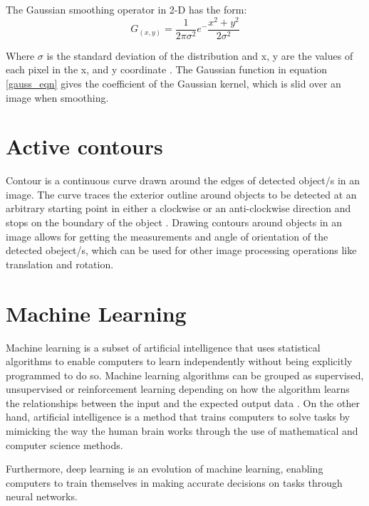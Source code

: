 The Gaussian smoothing operator in 2-D has the form:
\begin{equation} \label{gauss_eqn}
G_{(x,y)} = \frac{1}{2 \pi \sigma^2}e^-{\frac{x^2+y^2}{2\sigma^2}}
\end{equation}
 
Where $\sigma$ is the standard deviation of the distribution and x, y are the values of each pixel in the x, and y coordinate \cite{hsiao2007generic}. The Gaussian function in equation \ref{gauss_eqn} gives the coefficient of the Gaussian kernel, which is slid over an image when smoothing.

\section{Active contours}
Contour is a continuous curve drawn around the edges of detected object/s in an image. The curve traces the exterior outline around objects to be detected at an arbitrary starting point in either a clockwise or an anti-clockwise direction and stops on the boundary of the object \cite{waldchen2018plant}. Drawing contours around objects in an image allows for getting the measurements and angle of orientation of the detected obeject/s, which can be used for other image processing operations like translation and rotation. 



\section{Machine Learning}

Machine learning is a subset of artificial intelligence that uses statistical algorithms to enable computers to learn independently without being explicitly programmed to do so. Machine learning algorithms can be grouped as supervised, unsupervised or reinforcement learning depending on how the algorithm learns the relationships between the input and the expected output data \cite{goodfellow2016deep}. On the other hand, artificial intelligence is a method that trains computers to solve tasks by mimicking the way the human brain works through the use of mathematical and computer science methods.

Furthermore, deep learning is an evolution of machine learning, enabling computers to train themselves in making accurate decisions on tasks through neural networks. 

